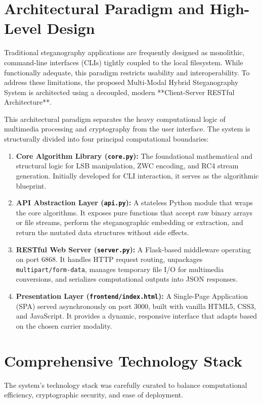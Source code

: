 \documentclass[12pt,a4paper]{report}
\begin{document}
\section{Architectural Paradigm and High-Level Design}
Traditional steganography applications are frequently designed as monolithic, command-line interfaces (CLIs) tightly coupled to the local filesystem. While functionally adequate, this paradigm restricts usability and interoperability. To address these limitations, the proposed Multi-Modal Hybrid Steganography System is architected using a decoupled, modern **Client-Server RESTful Architecture**. 

This architectural paradigm separates the heavy computational logic of multimedia processing and cryptography from the user interface. The system is structurally divided into four principal computational boundaries:
\begin{enumerate}
    \item \textbf{Core Algorithm Library (\texttt{core.py}):} The foundational mathematical and structural logic for LSB manipulation, ZWC encoding, and RC4 stream generation. Initially developed for CLI interaction, it serves as the algorithmic blueprint.
    \item \textbf{API Abstraction Layer (\texttt{api.py}):} A stateless Python module that wraps the core algorithms. It exposes pure functions that accept raw binary arrays or file streams, perform the steganographic embedding or extraction, and return the mutated data structures without side effects.
    \item \textbf{RESTful Web Server (\texttt{server.py}):} A Flask-based middleware operating on port 6868. It handles HTTP request routing, unpackages \texttt{multipart/form-data}, manages temporary file I/O for multimedia conversions, and serializes computational outputs into JSON responses.
    \item \textbf{Presentation Layer (\texttt{frontend/index.html}):} A Single-Page Application (SPA) served asynchronously on port 3000, built with vanilla HTML5, CSS3, and JavaScript. It provides a dynamic, responsive interface that adapts based on the chosen carrier modality.
\end{enumerate}

\section{Comprehensive Technology Stack}
The system's technology stack was carefully curated to balance computational efficiency, cryptographic security, and ease of deployment.
\end{document}
